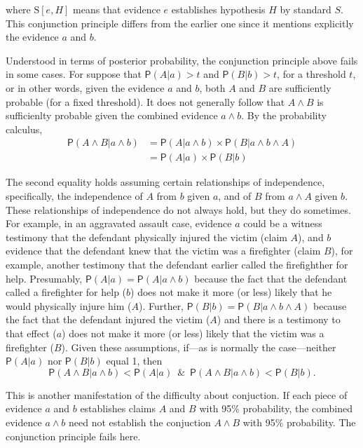 \documentclass[10pt,dvipsnames,enabledeprecatedfontcommands]{scrartcl}
\newcommand{\et}{\wedge}
\newcommand{\pr}[1]{\mathsf{P}(#1)}
\begin{document}
\noindent where \(\text{S}[e, H]\) means that evidence \(e\) establishes
hypothesis \(H\) by standard \(S\). This conjunction principle differs
from the earlier one since it mentions explicitly the evidence \(a\) and
\(b\).

Understood in terms of posterior probability, the conjunction principle
above fails in some cases. For suppose that \(\pr{A | a}>t\) and
\(\pr{B | b}>t\), for a threshold \(t\), or in other words, given the
evidence \(a\) and \(b\), both \(A\) and \(B\) are sufficiently probable
(for a fixed threshold). It does not generally follow that \(A \et B\)
is sufficienlty probable given the combined evidence \(a\et b\). By the
probability calculus, \begin{align*}
\pr{A \wedge  B | a \wedge b}& =\pr{A |a \wedge b} \times \pr{B | a \wedge b \wedge A}\\
 & = \pr{A |a} \times \pr{B | b}
 \end{align*}

\noindent The second equality holds assuming certain relationships of
independence, specifically, the independence of \(A\) from \(b\) given
\(a\), and of \(B\) from \(a \wedge A\) given \(b\). These relationships
of independence do not always hold, but they do sometimes. For example,
in an aggravated assault case, evidence \(a\) could be a witness
testimony that the defendant physically injured the victim (claim
\(A\)), and \(b\) evidence that the defendant knew that the victim was a
firefighter (claim \(B\)), for example, another testimony that the
defendant earlier called the firefighther for help. Presumably,
\(\pr{A \vert a}=\pr{A \vert a \wedge b}\) because the fact that the
defendant called a firefighter for help (\(b\)) does not make it more
(or less) likely that he would physically injure him (\(A\)). Further,
\(\pr{B \vert b}=\pr{B \vert a \wedge b \wedge A}\) because the fact
that the defendant injured the victim (\(A\)) and there is a testimony
to that effect (\(a\)) does not make it more (or less) likely that the
victim was a firefighter (\(B\)). Given these assumptions, if---as is
normally the case---neither \(\pr{A \vert a}\) nor \(\pr{B \vert b}\)
equal 1, then
\[\pr{A \wedge B \vert a \wedge b}< \pr{A \vert a} \;\ \& \;\ \pr{A \wedge B \vert a \wedge b} < \pr{B \vert b}. \]

\noindent This is another manifestation of the difficulty about
conjuction. If each piece of evidence \(a\) and \(b\) establishes claims
\(A\) and \(B\) with 95\% probability, the combined evidence \(a\et b\)
need not establish the conjuction \(A\et B\) with 95\% probability. The
conjunction principle fails here.
\end{document}
